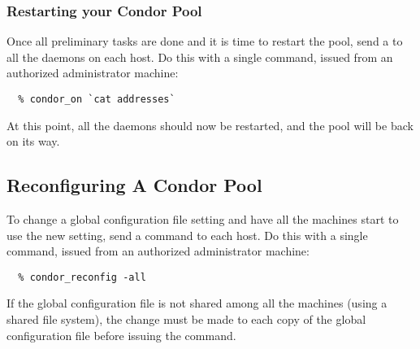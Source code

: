 \subsubsection{\label{sec:Pool-Restart}Restarting your Condor Pool}

Once all preliminary tasks are done and
it is time to restart the pool, send a
 to all the  daemons on each host.
Do this with a single command, issued from an authorized
administrator machine:
\begin{verbatim}
  % condor_on `cat addresses`
\end{verbatim}
At this point, all the daemons should now be restarted, and the pool
will be back on its way.

\subsection{\label{sec:Reconfigure-Pool}Reconfiguring A Condor Pool}

To change a global configuration file setting and have all the
machines start to use the new setting, send a
 command to each host.
Do this with a single command, issued from an authorized
administrator machine:
\begin{verbatim}
  % condor_reconfig -all
\end{verbatim}

If the global configuration file is not shared among all the machines
(using a shared file system), the change must be made to each
copy of the global configuration file before issuing the 
command.



